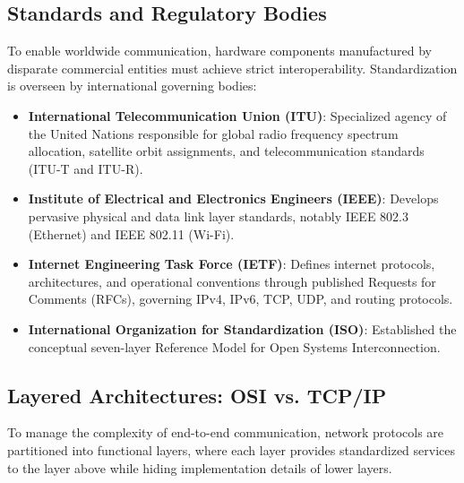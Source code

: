 \documentclass[10pt,twocolumn]{article}
\begin{document}
\subsection{Standards and Regulatory Bodies}
To enable worldwide communication, hardware components manufactured by disparate commercial entities must achieve strict interoperability. Standardization is overseen by international governing bodies:
\begin{itemize}
    \item \textbf{International Telecommunication Union (ITU)}: Specialized agency of the United Nations responsible for global radio frequency spectrum allocation, satellite orbit assignments, and telecommunication standards (ITU-T and ITU-R).
    \item \textbf{Institute of Electrical and Electronics Engineers (IEEE)}: Develops pervasive physical and data link layer standards, notably IEEE 802.3 (Ethernet) and IEEE 802.11 (Wi-Fi).
    \item \textbf{Internet Engineering Task Force (IETF)}: Defines internet protocols, architectures, and operational conventions through published Requests for Comments (RFCs), governing IPv4, IPv6, TCP, UDP, and routing protocols.
    \item \textbf{International Organization for Standardization (ISO)}: Established the conceptual seven-layer Reference Model for Open Systems Interconnection.
\end{itemize}

\subsection{Layered Architectures: OSI vs. TCP/IP}
To manage the complexity of end-to-end communication, network protocols are partitioned into functional layers, where each layer provides standardized services to the layer above while hiding implementation details of lower layers.
\end{document}
